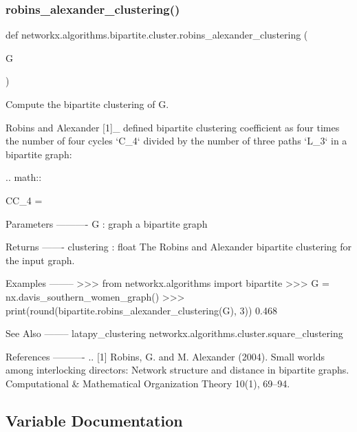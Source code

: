 \subsubsection{\texorpdfstring{robins\+\_\+alexander\+\_\+clustering()}{robins\_alexander\_clustering()}}
{\footnotesize\ttfamily def networkx.\+algorithms.\+bipartite.\+cluster.\+robins\+\_\+alexander\+\_\+clustering (\begin{DoxyParamCaption}\item[{}]{G }\end{DoxyParamCaption})}

\begin{DoxyVerb}Compute the bipartite clustering of G.

Robins and Alexander [1]_ defined bipartite clustering coefficient as
four times the number of four cycles `C_4` divided by the number of
three paths `L_3` in a bipartite graph:

.. math::

   CC_4 = 

Parameters
----------
G : graph
    a bipartite graph

Returns
-------
clustering : float
   The Robins and Alexander bipartite clustering for the input graph.

Examples
--------
>>> from networkx.algorithms import bipartite
>>> G = nx.davis_southern_women_graph()
>>> print(round(bipartite.robins_alexander_clustering(G), 3))
0.468

See Also
--------
latapy_clustering
networkx.algorithms.cluster.square_clustering

References
----------
.. [1] Robins, G. and M. Alexander (2004). Small worlds among interlocking
       directors: Network structure and distance in bipartite graphs.
       Computational & Mathematical Organization Theory 10(1), 69–94.\end{DoxyVerb}
 

\subsection{Variable Documentation}
\mbox{\label{namespacenetworkx_1_1algorithms_1_1bipartite_1_1cluster_a25b46a756db8ff1a00af83d2282ccb1e}} 
